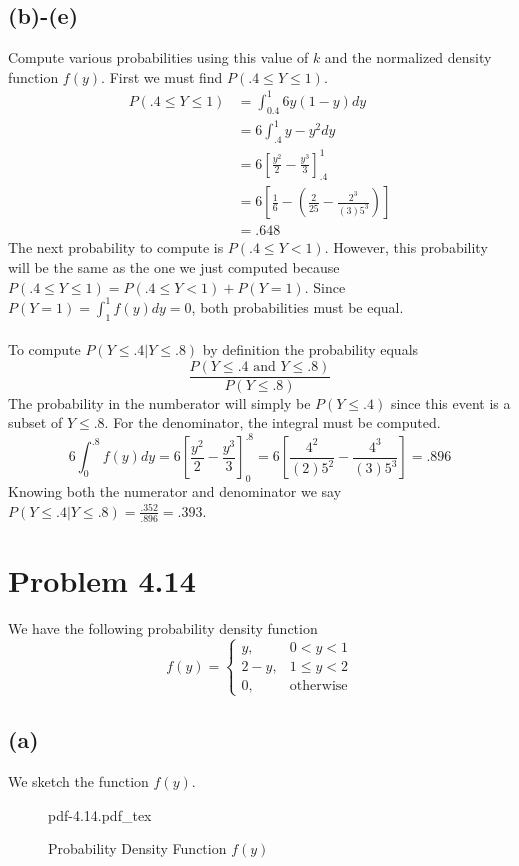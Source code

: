 \documentclass{article}
\theoremstyle{definition}
\begin{document}
    \subsection*{(b)-(e)}
        Compute various probabilities using this value of $k$ and the normalized density function $f(y)$. First
        we must find $P(.4 \leq Y \leq 1)$.
        \begin{align*}
            P(.4 \leq Y \leq 1) &= \int_{0.4}^1 6y(1-y)dy\\
            &= 6 \int_{.4}^1y - y^2dy\\
            &= 6\left[\frac{y^2}{2} - \frac{y^3}{3}\right]_{.4}^1\\
            &= 6 \left[ \frac{1}{6} - \left(\frac{2}{25} - \frac{2^3}{(3) 5^3}\right)   \right]\\
            &= .648
        \end{align*}
        The next probability to compute is $P(.4 \leq Y < 1)$. However, this probability will be the
        same as the one we just computed because $P(.4 \leq Y \leq 1) = P(.4 \leq Y < 1) + P(Y = 1)$.
        Since $P(Y = 1) = \int_1^1 f(y)dy = 0$, both probabilities must be equal. \\\\
        To compute $P(Y \leq .4 | Y \leq .8)$ by definition the probability equals 
        \[
            \frac{P(Y \leq .4 \text { and } Y \leq .8)}{P(Y \leq .8)}
        \]
        The probability in the numberator will simply be $P(Y \leq .4)$ since this event is a subset of $Y \leq .8$.
        For the denominator, the integral must be computed.
        \[
            6 \int_0^{.8} f(y) dy = 6\left[\frac{y^2}{2} - \frac{y^3}{3}\right]_0^{.8} = 6\left[\frac{4^2}{(2)5^2} - \frac{4^3}{(3)5^3}\right] = .896
        \]
        Knowing both the numerator and denominator we say $P(Y \leq .4 | Y \leq .8) = \frac{.352}{.896} = .393$.
\section*{Problem 4.14}
    We have the following probability density function
    \[
        f(y) =
        \begin{cases}
            y, & 0  < y < 1\\
            2-y, & 1 \leq y < 2\\
            0, & \text{otherwise}
        \end{cases}
    \]
    \subsection*{(a)}
        We sketch the function $f(y)$.
        \begin{figure}[ht]
            \centering
            \def\svgwidth{.5\linewidth}
            {pdf-4.14.pdf_tex}
            \caption{Probability Density Function $f(y)$}
            \label{fig:pdf-4.14}
        \end{figure}
\end{document}

